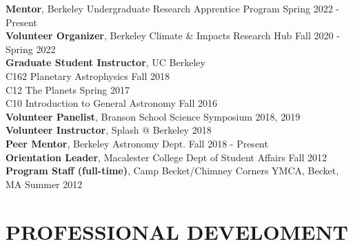 \documentclass[margin, 10pt]{res} %
\newcommand\tab[1][1cm]{\hspace*{#1}}
\begin{document}
\begin{resume}
{\bf Mentor}, Berkeley Undergraduate Research Apprentice Program \hfill Spring 2022 - Present \\
{\bf Volunteer Organizer}, Berkeley Climate \& Impacts Research Hub \hfill Fall 2020 - Spring 2022 \\
{\bf Graduate Student Instructor}, UC Berkeley \\
\tab C162 Planetary Astrophysics \hfill Fall 2018 \\
\tab C12 The Planets \hfill  Spring 2017 \\
\tab C10 Introduction to General Astronomy \hfill Fall 2016 \\
{\bf Volunteer Panelist}, Branson School Science Symposium \hfill 2018, 2019 \\
{\bf Volunteer Instructor}, Splash @ Berkeley \hfill 2018 \\
{\bf Peer Mentor}, Berkeley Astronomy Dept.
\hfill Fall 2018 - Present \\
{\bf Orientation Leader}, Macalester College Dept of Student Affairs
\hfill Fall 2012 \\
{\bf Program Staff (full-time)}, Camp Becket/Chimney Corners YMCA,
Becket, MA
\hfill Summer 2012



\section{PROFESSIONAL DEVELOMENT}


\end{resume}
\end{document}
